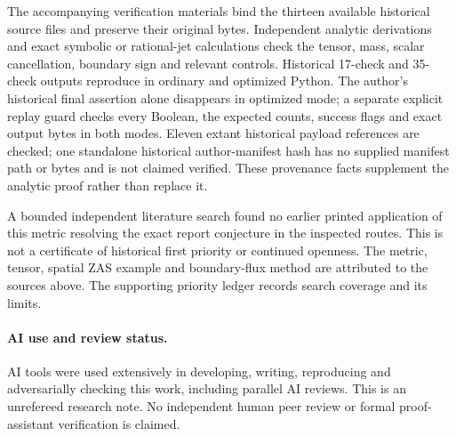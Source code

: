 \documentclass[11pt]{article}
\begin{document}
The accompanying verification materials bind the thirteen available
historical source files and preserve their original bytes. Independent
analytic derivations and exact symbolic or rational-jet calculations check
the tensor, mass, scalar cancellation, boundary sign and relevant controls.
Historical 17-check and 35-check outputs reproduce in ordinary and optimized
Python. The author's historical final assertion alone disappears in
optimized mode; a separate explicit replay guard checks every Boolean,
the expected counts, success flags and exact output bytes in both modes.
Eleven extant historical payload references are checked; one standalone
historical author-manifest hash has no supplied manifest path or bytes and
is not claimed verified. These provenance facts supplement the analytic
proof rather than replace it.

A bounded independent literature search found no earlier printed application
of this metric resolving the exact report conjecture in the inspected
routes. This is not a certificate of historical first priority or continued
openness. The metric, tensor, spatial ZAS example and boundary-flux method
are attributed to the sources above. The supporting priority ledger records
search coverage and its limits.

\paragraph{AI use and review status.}
AI tools were used extensively in developing, writing, reproducing and
adversarially checking this work, including parallel AI reviews. This is an
unrefereed research note. No independent human peer review or formal
proof-assistant verification is claimed.
\end{document}
